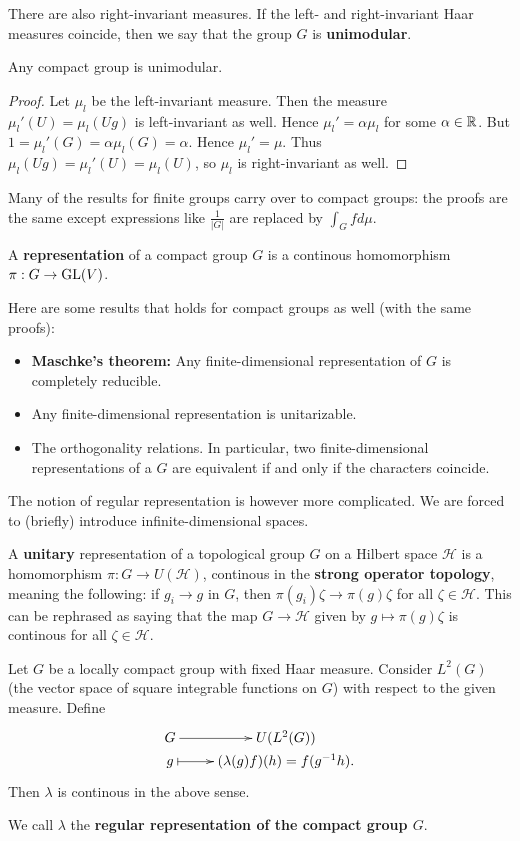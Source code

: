 \documentclass[11pt, english]{article}
\begin{document}
There are also right-invariant measures. If the left- and right-invariant Haar measures coincide, then we say that the group $G$ is \textbf{unimodular}.

\begin{lemma}
Any compact group is unimodular.  
\end{lemma}
\begin{proof}
 Let $\mu_l$ be the left-invariant measure. Then the measure $\mu_l'(U)= \mu_l(Ug)$ is left-invariant as well. Hence $\mu_l' = \alpha \mu_l$ for some $\alpha \in \mathbb{R}$. But $1=\mu_l'(G) = \alpha \mu_l(G) = \alpha$. Hence $\mu_l'=\mu$.
Thus $\mu_l(Ug)=\mu_l'(U)=\mu_l(U)$, so $\mu_l$ is right-invariant as well.
\end{proof}

Many of the results for finite groups carry over to compact groups: the proofs are the same except expressions like $\frac{1}{\lvert G \rvert}$ are replaced by $\int_G f d \mu$.

A \textbf{representation} of a compact group $G$ is a continous homomorphism $\pi:G \to \operatorname{GL}(V)$.

Here are some results that holds for compact groups as well (with the same proofs):
\begin{itemize}
\item \textbf{Maschke's theorem:} Any finite-dimensional representation of $G$ is completely reducible.
\item Any finite-dimensional representation is unitarizable.
\item The orthogonality relations. In particular, two finite-dimensional representations of a $G$ are equivalent if and only if the characters coincide. 
\end{itemize}

The notion of regular representation is however more complicated. We are forced to (briefly) introduce infinite-dimensional spaces.

A \textbf{unitary} representation of a topological group $G$ on a Hilbert space $\mathcal H$ is a homomorphism $\pi:G \to U(\mathcal H)$, continous in the \textbf{strong operator topology}, meaning the following: if $g_i \to g$ in $G$, then $\pi(g_i) \zeta \to \pi(g)\zeta$ for all $\zeta \in \mathcal H$. This can be rephrased as saying that the map $G \to \mathcal H$ given by $g \mapsto \pi(g) \zeta $ is continous for all $\zeta \in \mathcal H$.

\begin{example}
 Let $G$ be a locally compact group with fixed Haar measure. Consider $L^2(G)$ (the vector space of square integrable functions on $G$) with respect to the given measure. Define
$$
\xymatrix @ R = 0mm{
G \ar[r] &U(L^2(G)) \\
g \ar@{|->}[r] & (\lambda(g)f)(h) = f(g^{-1}h).
}
$$
Then $\lambda$ is continous in the above sense.

We call $\lambda$ the \textbf{regular representation of the compact group $G$}.
\end{example}
\end{document}
